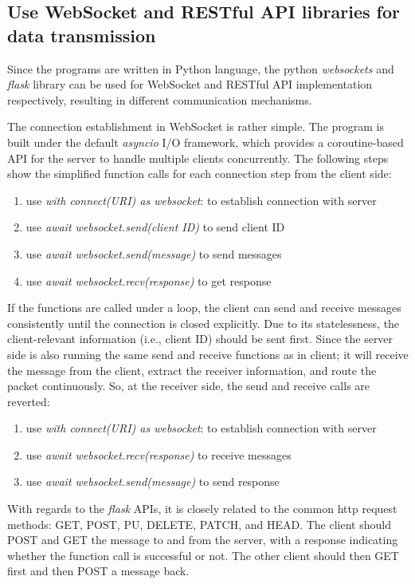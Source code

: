 \subsection{Use WebSocket and RESTful API libraries for data transmission}
Since the programs are written in Python language, the python \textit{websockets} 
and \textit{flask} library can be used for WebSocket and RESTful API implementation 
respectively, resulting in different communication mechanisms. 


The connection establishment in WebSocket is rather simple. The program is 
built under the default \textit{asyncio} I/O framework, which 
provides a coroutine-based API for the server to handle multiple clients 
concurrently. The following steps 
show the simplified function calls for each connection step from the client side: 
\begin{enumerate}
    \item use \textit{with connect(URI) as websocket}: to establish connection with server
    \item use \textit{await websocket.send(client ID)} to send client ID
    \item use \textit{await websocket.send(message)} to send messages
    \item use \textit{await websocket.recv(response)} to get response
\end{enumerate}
If the functions are called under a loop, the client can send and receive 
messages consistently until the connection is closed explicitly. 
Due to its statelessness, the client-relevant information (i.e., client ID) 
should be sent first. Since the server side is also running the same send 
and receive functions as in client; it will receive the message from the 
client, extract the receiver information, and route the packet continuously. 
So, at the receiver side, the send and receive calls are reverted: 
\begin{enumerate}
    \item use \textit{with connect(URI) as websocket}: to establish connection with server
    \item use \textit{await websocket.recv(response)} to receive messages
    \item use \textit{await websocket.send(message)} to send response
\end{enumerate}

With regards to the \textit{flask} APIs, it is closely related to the common 
\gls{http} request methods: GET, POST, PU, DELETE, PATCH, and HEAD. 
The client should POST and GET the message to and from the server, with 
a response indicating whether the function call is successful or not. The 
other client should then GET first and then POST a message back.  

